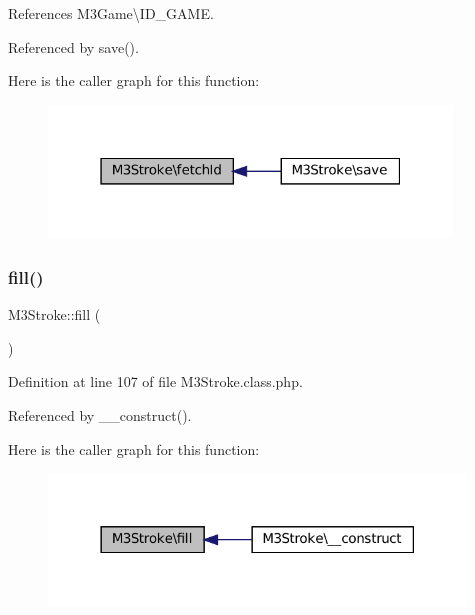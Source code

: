 References M3\+Game\textbackslash{}\+I\+D\+\_\+\+G\+A\+ME.



Referenced by save().

Here is the caller graph for this function\+:\nopagebreak
\begin{figure}[H]
\begin{center}
\leavevmode
\includegraphics[width=304pt]{class_m3_stroke_a576c40bd23077ab7457fb7d368c29d9f_icgraph}
\end{center}
\end{figure}
\mbox{\label{class_m3_stroke_ae3f223178f7b4d5fc817604242d06a63}} 
\subsubsection{\texorpdfstring{fill()}{fill()}}
{\footnotesize\ttfamily M3\+Stroke\+::fill (\begin{DoxyParamCaption}{ }\end{DoxyParamCaption})\hspace{0.3cm}{\ttfamily [protected]}}



Definition at line 107 of file M3\+Stroke.\+class.\+php.



Referenced by \+\_\+\+\_\+construct().

Here is the caller graph for this function\+:\nopagebreak
\begin{figure}[H]
\begin{center}
\leavevmode
\includegraphics[width=314pt]{class_m3_stroke_ae3f223178f7b4d5fc817604242d06a63_icgraph}
\end{center}
\end{figure}
\mbox{\label{class_m3_stroke_a5bb3f9ded8ee67731a90a464bd33ecea}} 

